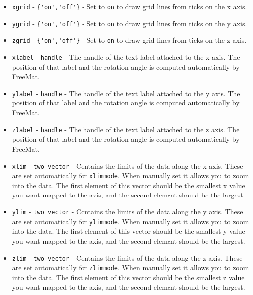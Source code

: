 \begin{itemize}
\item  \verb|xgrid| - \verb|{'on','off'}| - Set to \verb|on| to draw grid lines from ticks on
 the x axis.

\item  \verb|ygrid| - \verb|{'on','off'}| - Set to \verb|on| to draw grid lines from ticks on
 the y axis.

\item  \verb|zgrid| - \verb|{'on','off'}| - Set to \verb|on| to draw grid lines from ticks on
 the z axis.

\item  \verb|xlabel| - \verb|handle| - The handle of the text label attached to the x axis.
 The position of that label and the rotation angle is computed automatically by
 FreeMat.

\item  \verb|ylabel| - \verb|handle| - The handle of the text label attached to the y axis.
 The position of that label and the rotation angle is computed automatically by
 FreeMat.

\item  \verb|zlabel| - \verb|handle| - The handle of the text label attached to the z axis.
 The position of that label and the rotation angle is computed automatically by
 FreeMat.

\item  \verb|xlim| - \verb|two vector| - Contains the limits of the data along the x axis.
 These are set automatically for \verb|xlimmode|.  When manually set it allows you to
 zoom into the data.  The first element of this vector should be the smallest x value
 you want mapped to the axis, and the second element should be the largest.

\item  \verb|ylim| - \verb|two vector| - Contains the limits of the data along the y axis.
 These are set automatically for \verb|ylimmode|.  When manually set it allows you to
 zoom into the data.  The first element of this vector should be the smallest y value
 you want mapped to the axis, and the second element should be the largest.

\item  \verb|zlim| - \verb|two vector| - Contains the limits of the data along the z axis.
 These are set automatically for \verb|zlimmode|.  When manually set it allows you to
 zoom into the data.  The first element of this vector should be the smallest z value
 you want mapped to the axis, and the second element should be the largest.


\end{itemize}
